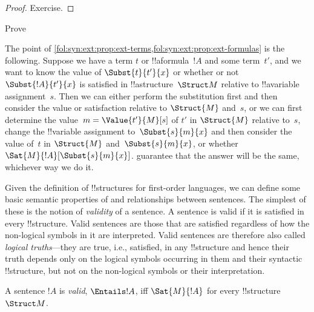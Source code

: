\begin{proof}
Exercise.
\end{proof}

\begin{prob}
Prove 
\end{prob}

\begin{explain}
  The point of
  \cref{fol:syn:ext:prop:ext-terms,fol:syn:ext:prop:ext-formulas} is
  the following. Suppose we have a term $t$ or !!a{formula}~$!A$ and
  some term~$t'$, and we want to know the value of $\Subst{t}{t'}{x}$
  or whether or not $\Subst{!A}{t'}{x}$ is satisfied in
  !!a{structure}~$\Struct M$ relative to !!a{variable} assignment~$s$.
  Then we can either perform the substitution first and then consider
  the value or satisfaction relative to $\Struct{M}$ and~$s$, or we
  can first determine the value~$m = \Value{t'}{M}[s]$ of $t'$ in
  $\Struct{M}$ relative to~$s$, change the !!{variable} assignment
  to~$\Subst{s}{m}{x}$ and then consider the value of~$t$ in
  $\Struct{M}$ and~$\Subst{s}{m}{x}$, or whether
  $\Sat{M}{!A}[\Subst{s}{m}{x}]$.
  guarantee that the answer will be the same, whichever way we do it.
\end{explain}






\begin{explain}
Given the definition of !!{structure}s for first-order languages, we can
define some basic semantic properties of and relationships between
sentences.  The simplest of these is the notion of \emph{validity} of
a sentence.  A sentence is valid if it is satisfied in every
!!{structure}.  Valid sentences are those that are satisfied regardless of
how the non-logical symbols in it are interpreted.  Valid sentences
are therefore also called \emph{logical truths}---they are true, i.e.,
satisfied, in any !!{structure} and hence their truth depends only on the
logical symbols occurring in them and their syntactic !!{structure}, but not
on the non-logical symbols or their interpretation.
\end{explain}

\begin{defn}[Validity]
A sentence $!A$ is \emph{valid}, $\Entails !A$, iff $\Sat{M}{!A}$ for every
!!{structure}~$\Struct M$.
\end{defn}

